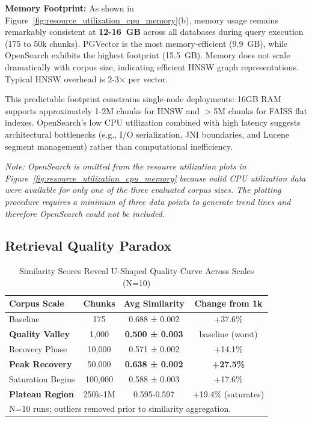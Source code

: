 \documentclass{article}
\begin{document}
\textbf{Memory Footprint:}
As shown in Figure~\ref{fig:resource_utilization_cpu_memory}(b), memory usage remains remarkably consistent at \textbf{12-16~GB} across all databases during query execution (175 to 50k chunks). PGVector is the most memory-efficient (9.9~GB), while OpenSearch exhibits the highest footprint (15.5~GB). Memory does not scale dramatically with corpus size, indicating efficient HNSW graph representations. Typical HNSW overhead is 2-3× per vector.

This predictable footprint constrains single-node deployments: 16GB RAM supports approximately 1-2M chunks for HNSW and $>$5M chunks for FAISS flat indexes. OpenSearch's low CPU utilization combined with high latency suggests architectural bottlenecks (e.g., I/O serialization, JNI boundaries, and Lucene segment management) rather than computational inefficiency.

\medskip
\noindent\emph{Note: OpenSearch is omitted from the resource utilization plots in Figure~\ref{fig:resource_utilization_cpu_memory} because valid CPU utilization data were available for only one of the three evaluated corpus sizes. The plotting procedure requires a minimum of three data points to generate trend lines and therefore OpenSearch could not be included.}

\subsection{Retrieval Quality Paradox}
\label{sec:quality_paradox}
\begin{table}[h]
\small
\centering
\caption{Similarity Scores Reveal U-Shaped Quality Curve Across Scales (N=10)}
\begin{tabular}{lccc}
\toprule
\textbf{Corpus Scale} & \textbf{Chunks} & \textbf{Avg Similarity} & \textbf{Change from 1k} \\
\midrule
Baseline & 175 & 0.688 ± 0.002 & +37.6\% \\
\textbf{Quality Valley} & 1,000 & \textbf{0.500 ± 0.003} & baseline (worst) \\
Recovery Phase & 10,000 & 0.571 ± 0.002 & +14.1\% \\
\textbf{Peak Recovery} & 50,000 & \textbf{0.638 ± 0.002} & \textbf{+27.5\%} \\
Saturation Begins & 100,000 & 0.588 ± 0.003 & +17.6\% \\
\textbf{Plateau Region} & 250k-1M & 0.595-0.597 & +19.4\% (saturates) \\
\bottomrule
\multicolumn{4}{l}{\small *N=10 runs; outliers removed prior to similarity aggregation.}
\end{tabular}
\label{tab:quality}
\end{table}
\end{document}
